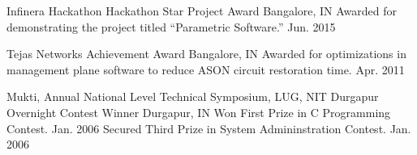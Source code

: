 \begin{cventries}
  \honorentry
    {Infinera Hackathon} %
    {Hackathon Star Project Award} %
    {Bangalore, IN}
    {
	\honorsubentry
	  {Awarded for demonstrating the project titled ``Parametric Software.''} %
	  {Jun. 2015} %
    }

  \honorentry
    {Tejas Networks} %
    {Achievement Award} %
    {Bangalore, IN}
    {
	\honorsubentry
	  {Awarded for optimizations in management plane software to reduce ASON circuit restoration time.} %
	  {Apr. 2011} %
    }

  \honorentry
    {Mukti, Annual National Level Technical Symposium, LUG, NIT Durgapur} %
    {Overnight Contest Winner} %
    {Durgapur, IN}
    {
	\honorsubentry
	  {Won First Prize in C Programming Contest.}
	  {Jan. 2006} %
	\honorsubentry
	  {Secured Third Prize in System Admininstration Contest.}
	  {Jan. 2006} %
    }


\end{cventries}


